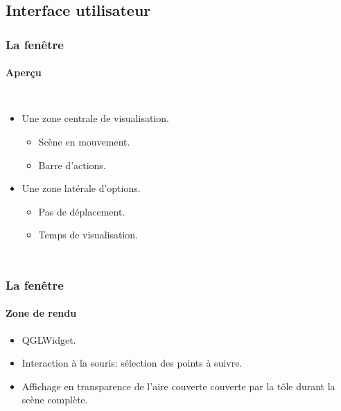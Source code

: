\documentclass{beamer}
\begin{document}
\subsection{Interface utilisateur}
\begin{frame}
    \frametitle{La fenêtre}
    \framesubtitle{Aperçu}
    \begin{columns}
        \begin{itemize}
            \item Une zone centrale de visualisation.
                \begin{itemize}
                    \item Scène en mouvement.
                    \item Barre d'actions.
                \end{itemize}
            \item Une zone latérale d'options.
                \begin{itemize}
                    \item Pas de déplacement.
                    \item Temps de visualisation.
                \end{itemize}
        \end{itemize}
        \begin{figure}
            \label{Fenetre}
        \end{figure}
    \end{columns}
\end{frame}
\begin{frame}
    \frametitle{La fenêtre}
    \framesubtitle{Zone de rendu}
    \begin{itemize}
        \item QGLWidget.
        \item Interaction à la souris: sélection des points à suivre.
        \item Affichage en transparence de l'aire couverte couverte par la tôle durant la scène complète.
    \end{itemize}
\end{frame}
\end{document}
